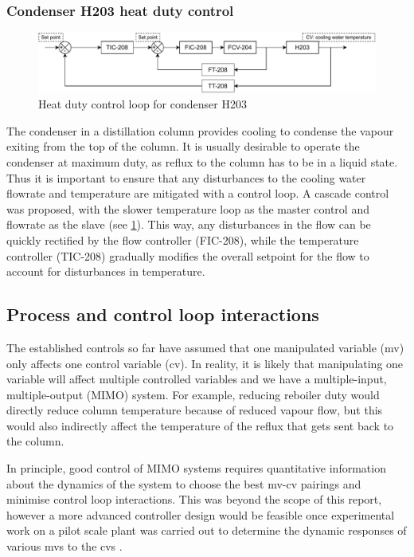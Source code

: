 \subsubsection{Condenser H203 heat duty control}%
\begin{figure}
    \centering
    \includegraphics[width=\linewidth]{chapters/4-operation-control/4-Figures/H203-TC.pdf}
    \caption{Heat duty control loop for condenser H203}
    \label{fig:S203C-TC}
\end{figure}
The condenser in a distillation column provides cooling to condense the vapour exiting from the top of the column. It is usually desirable to operate the condenser at maximum duty, as reflux to the column has to be in a liquid state. Thus it is important to ensure that any disturbances to the cooling water flowrate and temperature are mitigated with a control loop. A cascade control was proposed, with the slower temperature loop as the master control and flowrate as the slave (see \cref{fig:S203C-TC}). This way, any disturbances in the flow can be quickly rectified by the flow controller (FIC-208), while the temperature controller (TIC-208) gradually modifies the overall setpoint for the flow to account for disturbances in temperature.

\subsection{Process and control loop interactions}
The established controls so far have assumed that one manipulated variable (mv) only affects one control variable (cv). In reality, it is likely that manipulating one variable will affect multiple controlled variables and we have a multiple-input, multiple-output (MIMO) system. For example, reducing reboiler duty would directly reduce column temperature because of reduced vapour flow, but this would also indirectly affect the temperature of the reflux that gets sent back to the column. 

In principle, good control of MIMO systems requires quantitative information about the dynamics of the system to choose the best mv-cv pairings and minimise control loop interactions. This was beyond the scope of this report, however a more advanced controller design would be feasible once experimental work on a pilot scale plant was carried out to determine the dynamic responses of various mvs to the cvs \cite{seborg_process_2011}.

